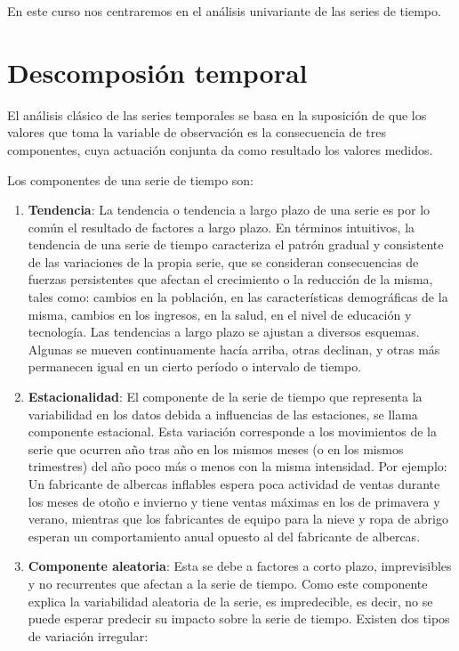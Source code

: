 \documentclass[
  a4paper,
  oneside,
  openany]{book}
\providecommand{\tightlist}{%
  \setlength{\itemsep}{0pt}\setlength{\parskip}{0pt}}
\begin{document}
En este curso nos centraremos en el análisis univariante de las series de tiempo.

\hypertarget{descomposiuxf3n-temporal}{%
\section{Descomposión temporal}\label{descomposiuxf3n-temporal}}

El análisis clásico de las series temporales se basa en la suposición de que los valores que toma la variable de observación es la consecuencia de tres componentes, cuya actuación conjunta da como resultado los valores medidos.

Los componentes de una serie de tiempo son:

\begin{enumerate}
\def\labelenumi{\arabic{enumi}.}
\tightlist
\item
  \textbf{Tendencia}: La tendencia o tendencia a largo plazo de una serie es por lo común el resultado de factores a largo plazo. En términos intuitivos, la tendencia de una serie de tiempo caracteriza el patrón gradual y consistente de las
  variaciones de la propia serie, que se consideran consecuencias de fuerzas persistentes que afectan el crecimiento o la reducción de la misma, tales como: cambios en la población, en las características demográficas de la misma, cambios en los ingresos, en la salud, en el nivel de educación y tecnología. Las tendencias a largo plazo se ajustan a diversos esquemas. Algunas se mueven continuamente hacía arriba, otras declinan, y otras más permanecen igual en un cierto período o intervalo de tiempo.\\
\item
  \textbf{Estacionalidad}: El componente de la serie de tiempo que representa la variabilidad en los datos debida a influencias de las estaciones, se llama componente estacional. Esta variación corresponde a los movimientos de la serie que ocurren año tras año en los mismos meses (o en los mismos trimestres) del año poco más o menos con la misma intensidad. Por ejemplo: Un fabricante de albercas inflables espera poca actividad de ventas durante los meses de otoño e invierno y tiene ventas máximas en los de primavera y verano, mientras que los fabricantes de equipo para la nieve y ropa de abrigo esperan un comportamiento anual opuesto al del fabricante de albercas.\\
\item
  \textbf{Componente aleatoria}: Esta se debe a factores a corto plazo, imprevisibles y no recurrentes que afectan a la serie de tiempo. Como este componente explica la variabilidad aleatoria de la serie, es impredecible, es decir, no se puede esperar predecir su impacto sobre la serie de tiempo. Existen dos tipos de variación irregular:


\end{enumerate}
\end{document}
